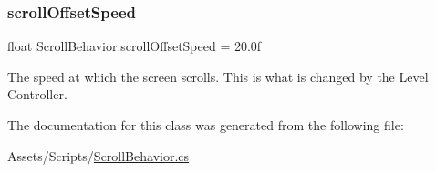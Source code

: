 \subsubsection{\texorpdfstring{scrollOffsetSpeed}{scrollOffsetSpeed}}
{\footnotesize\ttfamily float Scroll\+Behavior.\+scroll\+Offset\+Speed = 20.\+0f}



The speed at which the screen scrolls. This is what is changed by the Level Controller. 



The documentation for this class was generated from the following file\+:\begin{DoxyCompactItemize}
\item 
Assets/\+Scripts/\mbox{\hyperlink{_scroll_behavior_8cs}{Scroll\+Behavior.\+cs}}\end{DoxyCompactItemize}
